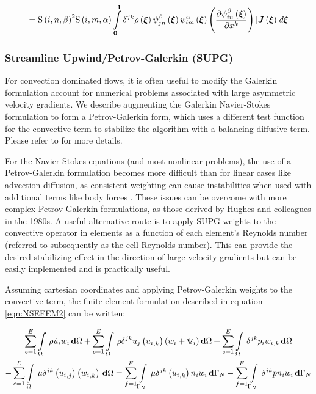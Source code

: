 \begin{equation}
 [g^{\alpha\beta}_{mn}]=
 {\idxgsf{i}{n}{\beta}}^2{\idxgsf{i}{m}{\alpha}}
   \dintl{\vectr{0}}{\vectr{1}}\delta^{jk}{\fnof{\rho}{\vectr{\xi}}\idxgbfn{j}{n}{\beta}{\vectr{\xi}}
   \idxgbfn{i}{m}{\alpha}{\vectr{\xi}}
     \pbrac{\delby{\idxgbfn{i}{n}{\beta}{\vectr{\xi}}}{x^{k}}}
  \abs{\fnof{\matr{J}}{\vectr{\xi}}}}d{\vectr{\xi}}
\end{equation}

\subsubsection{Streamline Upwind/Petrov-Galerkin (SUPG)}

For convection dominated flows, it is often useful to modify the Galerkin
formulation account for numerical problems associated with large asymmetric
velocity gradients. We describe augmenting the Galerkin Navier-Stokes
formulation to form a Petrov-Galerkin form, which uses a different test
function for the convective term to stabilize the algorithm with a balancing
diffusive term. Please refer to  for
more details.

For the Navier-Stokes equations (and most nonlinear problems), the use of a
Petrov-Galerkin formulation becomes more difficult than for linear cases like
advection-diffusion, as consistent weighting can cause instabilities when used
with additional terms like body forces \cite{heinrich:1999}. These issues can
be overcome with more complex Petrov-Galerkin formulations, as those derived
by Hughes and colleagues in the 1980s. A useful alternative route is to apply
SUPG weights to the convective operator in elements as a function of each
element's Reynolds number (referred to subsequently as the cell Reynolds
number). This can provide the desired stabilizing effect in the direction of
large velocity gradients but can be easily implemented and is practically
useful.

Assuming cartesian coordinates and applying Petrov-Galerkin weights to the
convective term, the finite element formulation described in equation
\ref{eqn:NSEFEM2} can be written:

\begin{multline}
  \dsum_{e=1}^{E}\gint{\Omega}{}{\rho\dot{u}_{i}w_{i}}{\Omega}
  +\dsum_{e=1}^{E}\gint{\Omega}{}{{\rho}{\delta}^{jk}{u_j}\pbrac{\partialderiv{u_{i}}{k}}({w_{i}+\Psi_{i}})}{\Omega}
  +\dsum_{e=1}^{E}\gint{\Omega}{}{{\delta}^{jk}{p_{i}}{\partialderiv{w_{i}}{k}}}{\Omega}\\
  -\dsum_{e=1}^{E}\gint{\Omega}{}{{\mu}{\delta}^{jk}\pbrac{\partialderiv{u_{i}}{j}}\pbrac{\partialderiv{w_{i}}{k}}}{\Omega}=
  \dsum_{f=1}^{F}\gint{\Gamma_N}{}{{\mu}{\delta}^{jk}\pbrac{\partialderiv{u_{i}}{k}}{n_{i}}{w_{i}}}{\Gamma_N}
  -\dsum_{f=1}^{F}\gint{\Gamma_N}{}{{\delta}^{jk}{p}{n_i}{w_i}}{\Gamma_N}
  \label{eqn:NSEPGFEM1}
\end{multline}

